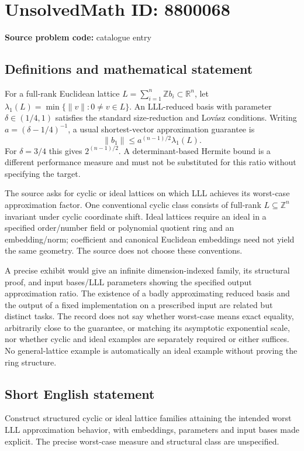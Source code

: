 \documentclass[11pt]{article}
\newcommand{\Z}{\mathbb{Z}}
\newcommand{\R}{\mathbb{R}}
\begin{document}
\section*{UnsolvedMath ID: 8800068}
\textbf{Source problem code:} catalogue entry
\subsection{Definitions and mathematical statement}
For a full-rank Euclidean lattice $L=\sum_{i=1}^n\Z b_i\subset\R^n$, let $\lambda_1(L)=\min\{\|v\|:0\ne v\in L\}$. An LLL-reduced basis with parameter $\delta\in(1/4,1)$ satisfies the standard size-reduction and Lov\'asz conditions. Writing $a=(\delta-1/4)^{-1}$, a usual shortest-vector approximation guarantee is
\[
\|b_1\|\leq a^{(n-1)/2}\lambda_1(L).
\]
For $\delta=3/4$ this gives $2^{(n-1)/2}$. A determinant-based Hermite bound is a different performance measure and must not be substituted for this ratio without specifying the target.

The source asks for cyclic or ideal lattices on which LLL achieves its worst-case approximation factor. One conventional cyclic class consists of full-rank $L\subseteq\Z^n$ invariant under cyclic coordinate shift. Ideal lattices require an ideal in a specified order/number field or polynomial quotient ring and an embedding/norm; coefficient and canonical Euclidean embeddings need not yield the same geometry. The source does not choose these conventions.

A precise exhibit would give an infinite dimension-indexed family, its structural proof, and input bases/LLL parameters showing the specified output approximation ratio. The existence of a badly approximating reduced basis and the output of a fixed implementation on a prescribed input are related but distinct tasks. The record does not say whether worst-case means exact equality, arbitrarily close to the guarantee, or matching its asymptotic exponential scale, nor whether cyclic and ideal examples are separately required or either suffices. No general-lattice example is automatically an ideal example without proving the ring structure.
\subsection{Short English statement}
Construct structured cyclic or ideal lattice families attaining the intended worst LLL approximation behavior, with embeddings, parameters and input bases made explicit. The precise worst-case measure and structural class are unspecified.
\end{document}
